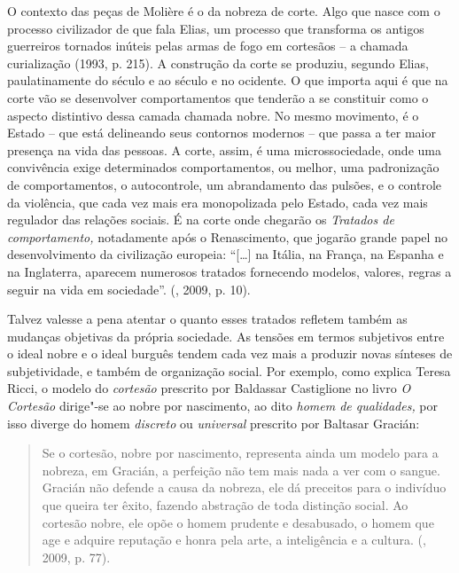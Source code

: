 O contexto das peças de Molière é o da nobreza de corte. Algo que nasce
com o processo civilizador de que fala Elias, um processo que transforma
os antigos guerreiros tornados inúteis pelas armas de fogo em cortesãos
-- a chamada curialização (1993, p. 215). A construção da corte se
produziu, segundo Elias, paulatinamente do século  e  ao século
 e  no ocidente. O que importa aqui é que na corte vão se
desenvolver comportamentos que tenderão a se constituir como o aspecto
distintivo dessa camada chamada nobre. No mesmo movimento, é o Estado --
que está delineando seus contornos modernos -- que passa a ter maior
presença na vida das pessoas. A corte, assim, é uma microssociedade,
onde uma convivência exige determinados comportamentos, ou melhor, uma
padronização de comportamentos, o autocontrole, um abrandamento das
pulsões, e o controle da violência, que cada vez mais era monopolizada
pelo Estado, cada vez mais regulador das relações sociais. É na corte
onde chegarão os \emph{Tratados de comportamento,} notadamente após o
Renascimento, que jogarão grande papel no desenvolvimento da civilização
europeia: ``[\ldots{}] na Itália, na França, na Espanha e na
Inglaterra, aparecem numerosos tratados fornecendo modelos, valores,
regras a seguir na vida em sociedade''. (, 2009, p. 10).

Talvez valesse a pena atentar o quanto esses tratados refletem também as
mudanças objetivas da própria sociedade. As tensões em termos subjetivos
entre o ideal nobre e o ideal burguês tendem cada vez mais a produzir
novas sínteses de subjetividade, e também de organização social. Por
exemplo, como explica Teresa Ricci, o modelo do \emph{cortesão}
prescrito por Baldassar Castiglione no livro \emph{O Cortesão} dirige"-se
ao nobre por nascimento, ao dito \emph{homem de qualidades,} por isso
diverge do homem \emph{discreto} ou \emph{universal} prescrito por
Baltasar Gracián:

\begin{quote}
Se o cortesão, nobre por nascimento, representa ainda um modelo para a
nobreza, em Gracián, a perfeição não tem mais nada a ver com o sangue.
Gracián não defende a causa da nobreza, ele dá preceitos para o
indivíduo que queira ter êxito, fazendo abstração de toda distinção
social. Ao cortesão nobre, ele opõe o homem prudente e desabusado, o
homem que age e adquire reputação e honra pela arte, a inteligência e a
cultura. (, 2009, p. 77).
\end{quote}

